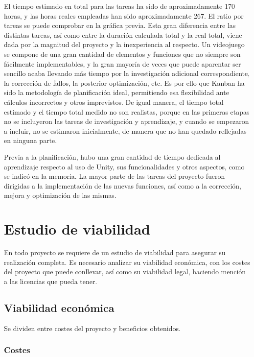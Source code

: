 
El tiempo estimado en total para las tareas ha sido de aproximadamente 170 horas, y las horas reales empleadas han sido aproximadamente 267. El ratio por tareas se puede comprobar en la gráfica previa. Esta gran diferencia entre las distintas tareas, así como entre la duración calculada total y la real total, viene dada por la magnitud del proyecto y la inexperiencia al respecto. Un videojuego se compone de una gran cantidad de elementos y funciones que no siempre son fácilmente implementables, y la gran mayoría de veces que puede aparentar ser sencillo acaba llevando más tiempo por la investigación adicional correspondiente, la corrección de fallos, la posterior optimización, etc. Es por ello que Kanban ha sido la metodología de planificación ideal, permitiendo esa flexibilidad ante cálculos incorrectos y otros imprevistos. De igual manera, el tiempo total estimado y el tiempo total medido no son realistas, porque en las primeras etapas no se incluyeron las tareas de investigación y aprendizaje, y cuando se empezaron a incluir, no se estimaron inicialmente, de manera que no han quedado reflejadas en ninguna parte.

Previa a la planificación, hubo una gran cantidad de tiempo dedicada al aprendizaje respecto al uso de Unity, sus funcionalidades y otros aspectos, como se indicó en la memoria. La mayor parte de las tareas del proyecto fueron dirigidas a la implementación de las nuevas funciones, así como a la corrección, mejora y optimización de las mismas.

\section{Estudio de viabilidad}

En todo proyecto se requiere de un estudio de viabilidad para asegurar su realización completa. Es necesario analizar su viabilidad económica, con los costes del proyecto que puede conllevar, así como su viabilidad legal, haciendo mención a las licencias que pueda tener.

\subsection{Viabilidad económica}

Se dividen entre costes del proyecto y beneficios obtenidos.

\subsubsection{Costes}

